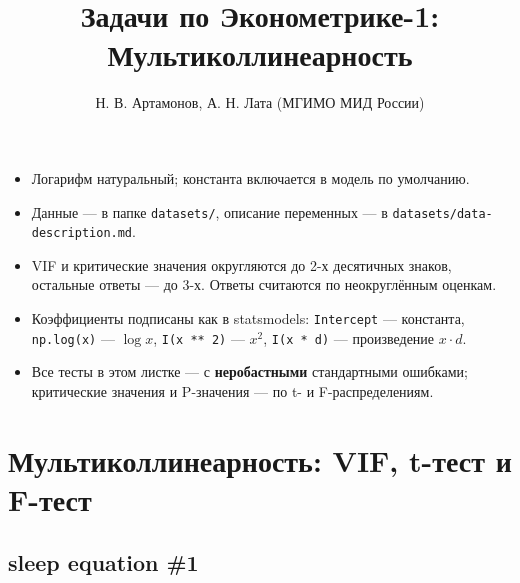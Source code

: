 \documentclass[
  russian,
]{article}
\title{Задачи по Эконометрике-1: Мультиколлинеарность}
\author{Н. В. Артамонов, А. Н. Лата (МГИМО МИД России)}
\date{}
\providecommand{\tightlist}{%
  \setlength{\itemsep}{0pt}\setlength{\parskip}{0pt}}
\renewcommand*\contentsname{Содержание}
\newcommand\contentsname{Содержание}
\begin{document}
\maketitle

\renewcommand*\contentsname{Содержание}
{
\setcounter{tocdepth}{3}
\tableofcontents
}

\begin{tcolorbox}[enhanced jigsaw, arc=.35mm, bottomrule=.15mm, bottomtitle=1mm, breakable, colback=white, colbacktitle=quarto-callout-important-color!10!white, colframe=quarto-callout-important-color-frame, coltitle=black, left=2mm, leftrule=.75mm, opacityback=0, opacitybacktitle=0.6, rightrule=.15mm, title=\textcolor{quarto-callout-important-color}{\faExclamation}\hspace{0.5em}{Важно}, titlerule=0mm, toprule=.15mm, toptitle=1mm]

\begin{itemize}
\tightlist
\item
  Логарифм натуральный; константа включается в модель по умолчанию.
\item
  Данные --- в папке \texttt{datasets/}, описание переменных --- в
  \texttt{datasets/data-description.md}.
\item
  VIF и критические значения округляются до 2-х десятичных знаков,
  остальные ответы --- до 3-х. Ответы считаются по неокруглённым
  оценкам.
\item
  Коэффициенты подписаны как в statsmodels: \texttt{Intercept} ---
  константа, \texttt{np.log(x)} --- \(\log x\), \texttt{I(x\ **\ 2)} ---
  \(x^2\), \texttt{I(x\ *\ d)} --- произведение \(x\cdot d\).
\item
  Все тесты в этом листке --- с \textbf{неробастными} стандартными
  ошибками; критические значения и P-значения --- по t- и
  F-распределениям.
\end{itemize}

\end{tcolorbox}

\section{Мультиколлинеарность: VIF, t-тест и
F-тест}\label{ux43cux443ux43bux44cux442ux438ux43aux43eux43bux43bux438ux43dux435ux430ux440ux43dux43eux441ux442ux44c-vif-t-ux442ux435ux441ux442-ux438-f-ux442ux435ux441ux442}

\subsection{sleep equation \#1}\label{sleep-equation-1}
\end{document}
